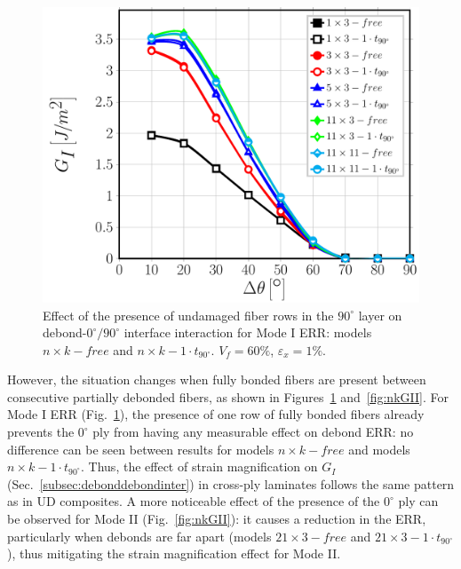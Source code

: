 \documentclass[review]{elsarticle}
\begin{document}
\begin{figure}[!h]
\centering
\includegraphics[width=\textwidth]{nxk-1-vf60-GI.pdf}
\caption{Effect of the presence of undamaged fiber rows in the $90^{\circ}$ layer on debond-$0^{\circ}/90^{\circ}$ interface interaction for Mode I ERR: models $n\times k-free$ and $n\times k-1\cdot t_{90^{\circ}}$. $V_{f}=60\%$, $\varepsilon_{x}=1\%$.}\label{fig:nkGI}
\end{figure}

However, the situation changes when fully bonded fibers are present between consecutive partially debonded fibers, as shown in Figures~\ref{fig:nkGI} and~\ref{fig:nkGII}. For Mode I ERR (Fig.~\ref{fig:nkGI}), the presence of one row of fully bonded fibers already prevents the $0^{\circ}$ ply from having any measurable effect on debond ERR: no difference can be seen between results for models $n\times k-free$ and models $n\times k-1\cdot t_{90^{\circ}}$. Thus, the effect of strain magnification on $G_{I}$ (Sec.~\ref{subsec:debonddebondinter}) in cross-ply laminates follows the same pattern as in UD composites. A more noticeable effect of the presence of the $0^{\circ}$ ply can be observed for Mode II (Fig.~\ref{fig:nkGII}): it causes a reduction in the ERR, particularly when debonds are far apart (models $21\times 3-free$ and $21\times 3-1\cdot t_{90^{\circ}}$), thus mitigating the strain magnification effect for Mode II.
\end{document}
